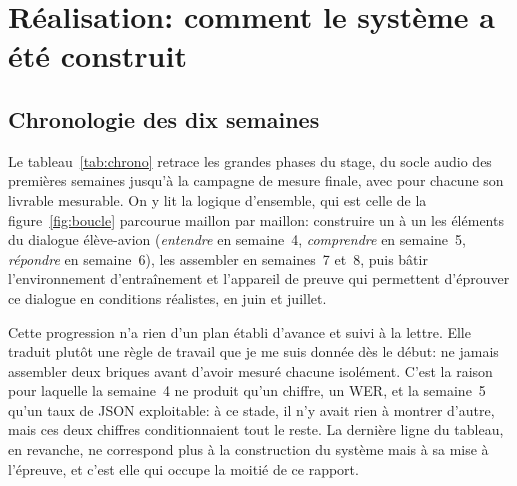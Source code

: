 \documentclass[11pt,a4paper]{article}
\begin{document}
\FloatBarrier

\section{Réalisation: comment le système a été construit}
\label{sec:realisation}

\subsection{Chronologie des dix semaines}

Le tableau~\ref{tab:chrono} retrace les grandes phases du stage, du socle audio des premières semaines jusqu'à la campagne de mesure finale, avec pour chacune son livrable mesurable. On y lit la logique d'ensemble, qui est celle de la figure~\ref{fig:boucle} parcourue maillon par maillon: construire un à un les éléments du dialogue élève-avion (\emph{entendre} en semaine~4, \emph{comprendre} en semaine~5, \emph{répondre} en semaine~6), les assembler en semaines~7 et~8, puis bâtir l'environnement d'entraînement et l'appareil de preuve qui permettent d'éprouver ce dialogue en conditions réalistes, en juin et juillet. 

Cette progression n'a rien d'un plan établi d'avance et suivi à la lettre. Elle traduit plutôt une règle de travail que je me suis donnée dès le début: ne jamais assembler deux briques avant d'avoir mesuré chacune isolément. C'est la raison pour laquelle la semaine~4 ne produit qu'un chiffre, un WER, et la semaine~5 qu'un taux de JSON exploitable: à ce stade, il n'y avait rien à montrer d'autre, mais ces deux chiffres conditionnaient tout le reste. La dernière ligne du tableau, en revanche, ne correspond plus à la construction du système mais à sa mise à l'épreuve, et c'est elle qui occupe la moitié de ce rapport.
\end{document}
